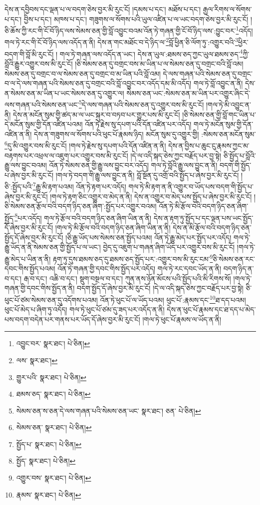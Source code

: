 དེས་ན་དབྱིབས་དང་ལྡན་པ་ལ་བདག་ཅེས་བྱར་མི་རུང་ངོ། །དམས་པ་དང་། མཐོས་པ་དང་། རྒྱལ་རིགས་ལ་སོགས་པ་དང་། བྱིས་པ་དང་། མཁས་པ་དང་། གཟུགས་ལ་སོགས་པའི་ཡུལ་འཛིན་པ་ལ་ཡང་བདག་ཅེས་བྱར་མི་རུང་ངོ། །ཅི་ཆོས་ཀྱི་རང་གི་ངོ་བོ་ཉིད་ལས་སེམས་ཅན་གྱི་བློ་འབྱུང་བའམ་འོན་ཏེ་གཞན་གྱི་ངོ་བོ་ཉིད་ལས་:བྱུང་བར་\footnote{འབྱུང་བར་  སྣར་ཐང་།  པེ་ཅིན། }འདོད། གལ་ཏེ་རང་གི་ངོ་བོ་ཉིད་ལས་འདོད་ན་ནི། དེས་ན་གང་མཐོང་བ་དེ་ཉིད་ལ་\footnote{ལས་  སྣར་ཐང་། }བློ་ཕྱིན་ཅི་ལོག་ཏུ་:འགྱུར་བའི་\footnote{གྱུར་པའི་  སྣར་ཐང་།  པེ་ཅིན། }ཕྱིར་བདག་གི་བློ་མི་རུང་ངོ། །
གལ་ཏེ་གཞན་ལས་འདོད་ན་ཡང་། དེས་ན་ཡུལ་:ཐམས་ཅད་ཀྱང་ཡུལ་ཐམས་ཅད་\footnote{ཐམས་ཅད་  སྣར་ཐང་།  པེ་ཅིན། }ཀྱི་བློའི་རྒྱུར་འགྱུར་བས་མི་རུང་ངོ། །ཅི་སེམས་ཅན་དུ་བགྲང་བས་མ་ཡིན་པ་ལ་སེམས་ཅན་དུ་བགྲང་བའི་བློ་འམ། སེམས་ཅན་དུ་བགྲང་བ་ལ་སེམས་ཅན་དུ་བགྲང་བ་མ་ཡིན་པའི་བློ་འམ། དེ་ལས་གཞན་པའི་སེམས་ཅན་དུ་བགྲང་བ་ལ་དེ་ལས་གཞན་པའི་སེམས་ཅན་དུ་བགྲང་བའི་བློ་འབྱུང་བར་འདོད་དམ་མི་འདོད། གལ་ཏེ་བློ་འབྱུང་ན་ནི། དེས་ན་སེམས་ཅན་མ་ཡིན་པ་ཡང་སེམས་ཅན་དུ་འགྱུར་ལ། སེམས་ཅན་ཡང་:སེམས་ཅན་མ་ཡིན་པར་འགྱུར་ཞིང་དེ་ལས་གཞན་པའི་སེམས་ཅན་ཡང་\footnote{སེམས་ཅན་ས་ཅན་དེ་ལས་གཞན་པའི་སེམས་ཅན་ཡང་  སྣར་ཐང་། ཅན་  པེ་ཅིན། }དེ་ལས་གཞན་པའི་སེམས་ཅན་དུ་འགྱུར་བས་མི་རུང་ངོ། །གལ་ཏེ་མི་འབྱུང་ན་ནི། དེས་ན་མངོན་སུམ་གྱི་ཚད་མ་ལ་ཡང་སྐུར་བ་བཏབ་པར་གྱུར་པས་མི་རུང་ངོ། །ཅི་སེམས་ཅན་གྱི་བློ་གང་ཡིན་པ་དེ་མངོན་སུམ་གྱི་དོན་འཛིན་པའམ། འོན་ཏེ་རྗེས་སུ་དཔག་པའི་དོན་འཛིན་པར་འདོད། གལ་ཏེ་མངོན་སུམ་གྱི་དོན་འཛིན་ན་ནི། དེས་ན་གཟུགས་ལ་སོགས་པའི་ཕུང་པོ་རྣམས་ཉིད། མངོན་སུམ་དུ་འགྱུར་གྱི། :སེམས་ཅན་མངོན་སུམ་\footnote{སེམས་ཅན་  སྣར་ཐང་།  པེ་ཅིན། }དུ་མི་འགྱུར་བས་མི་རུང་ངོ། །གལ་ཏེ་རྗེས་སུ་དཔག་པའི་དོན་འཛིན་ན་ནི། དེས་ན་བྱིས་པ་ཆུང་ངུ་རྣམས་ཀྱང་མ་བརྟགས་པར་འཕྲལ་ལ་འཇུག་པར་འགྱུར་བས་མི་རུང་ངོ། །དེ་ལ་འདི་སྐད་ཅེས་ཀྱང་བརྗོད་པར་བྱ་སྟེ། ཅི་སྤྱོད་པ་བློའི་རྒྱུ་ལས་བྱུང་བའམ། འོན་ཏེ་སེམས་ཅན་གྱི་རྒྱུ་ལས་བྱུང་བར་འདོད། གལ་ཏེ་བློའི་རྒྱུ་ལས་བྱུང་ན་ནི། བདག་གི་སྤྱོད་པ་ཞེས་བྱར་མི་རུང་ངོ། །གལ་ཏེ་བདག་གི་རྒྱུ་ལས་བྱུང་ན་ནི། བློ་སྔོན་དུ་འགྲོ་བའི་སྤྱོད་པ་ཞེས་བྱར་མི་རུང་ངོ། །ཅི་:སྤྱོད་པའི་\footnote{སྤྱོད་པ་  སྣར་ཐང་།  པེ་ཅིན། }རྒྱུ་མི་རྟག་པའམ། འོན་ཏེ་རྟག་པར་འདོད། གལ་ཏེ་མི་རྟག་ན་ནི་འགྱུར་བ་ཡོད་པས་བདག་གི་སྤྱོད་པ་ཞེས་བྱར་མི་རུང་ངོ། །གལ་ཏེ་རྟག་ཅིང་འགྱུར་བ་མེད་ན་ནི། དེས་ན་འགྱུར་བ་མེད་པས་སྤྱོད་པ་ཞེས་བྱར་མི་རུང་ངོ། །ཅི་སེམས་ཅན་རྩོལ་བའི་བདག་ཉིད་ཅན་ཞིག་:སྤྱོད་པར་འགྱུར་བའམ། འོན་ཏེ་མི་རྩོལ་བའི་བདག་ཉིད་ཅན་ཞིག་སྤྱོད་\footnote{སྤྱོད་  སྣར་ཐང་།  པེ་ཅིན། }པར་འདོད། གལ་ཏེ་རྩོལ་བའི་བདག་ཉིད་ཅན་ཞིག་ཡིན་ན་ནི། དེས་ན་རྟག་ཏུ་སྤྱོད་པ་དང་ལྡན་པས་ཡང་སྤྱོད་དོ་ཞེས་བྱར་མི་རུང་ངོ། །གལ་ཏེ་མི་རྩོལ་བའི་བདག་ཉིད་ཅན་ཞིག་ཡིན་ན་ནི། དེས་ན་མི་རྩོལ་བའི་བདག་ཉིད་ཅན་སྤྱོད་དོ་ཞེས་བྱར་མི་རུང་ངོ། །ཅི་རྒྱུ་ཡོད་པས་སེམས་ཅན་སྤྱོད་པའམ། འོན་ཏེ་རྒྱུ་མེད་པར་སྤྱོད་པར་འདོད། གལ་ཏེ་རྒྱུ་ཡོད་ན་ནི་སེམས་ཅན་གྱི་སྤྱོད་པ་ལ་ཡང་། བྱེད་དུ་འཇུག་པ་གཞན་ཞིག་ཡོད་པར་འགྱུར་བས་མི་རུང་ངོ། །གལ་ཏེ་རྒྱུ་མེད་པ་ཡིན་ན་ནི། རྟག་ཏུ་དུས་ཐམས་ཅད་དུ་ཐམས་ཅད་སྤྱོད་པར་:འགྱུར་བས་མི་རུང་ངམ་\footnote{འགྱུར་བས་  སྣར་ཐང་།  པེ་ཅིན། }ཅི་སེམས་ཅན་རང་དབང་གིས་སྤྱོད་པའམ། འོན་ཏེ་གཞན་གྱི་དབང་གིས་སྤྱོད་པར་འདོད། གལ་ཏེ་རང་དབང་ཡོད་ན་ནི། བདག་ཉིད་ན་བ་དང་། རྒ་བ་དང་། འཆི་བ་དང་། སྡུག་བསྔལ་བ་དང་། ཀུན་ནས་ཉོན་མོངས་པའི་སྤྱོད་པའི་མི་རིགས་སོ། །གལ་ཏེ་གཞན་གྱི་དབང་གིས་སྤྱོད་ན་ནི། བདག་སྤྱོད་དོ་ཞེས་བྱར་མི་རུང་ངོ། །དེ་ལ་འདི་སྐད་ཅེས་ཀྱང་བརྗོད་པར་བྱ་སྟེ། ཅི་ཕུང་པོ་ཙམ་སེམས་ཅན་དུ་འདོགས་པའམ། འོན་ཏེ་ཕུང་པོ་ལ་ཡོད་པའམ། ཕུང་པོ་:རྣམས་དང་\footnote{རྣམས་  སྣར་ཐང་།  པེ་ཅིན། }ཐ་དད་པའམ། ཕུང་པོ་མེད་པ་ཞིག་ཏུ་འདོད། གལ་ཏེ་ཕུང་པོ་ཙམ་དུ་ཟད་པར་འདོད་ན་ནི། དེས་ན་ཕུང་པོ་རྣམས་དང་ཐ་དད་པ་མེད་པས་བདག་བདེན་པར་གནས་པར་ཡོད་དོ་ཞེས་བྱར་མི་རུང་ངོ། །གལ་ཏེ་ཕུང་པོ་རྣམས་ལ་ཡོད་ན་ནི། 
